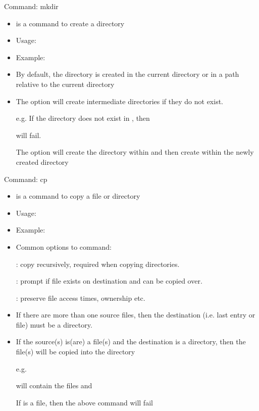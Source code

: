 \documentclass[10pt,t]{beamer}
\begin{document}
\begin{frame}[fragile]{Command: mkdir}
  \begin{itemize}
    \item {} is a command to create a directory
    \item Usage: 
    \item Example: 
    \item By default, the directory is created in the current directory or in a path relative to the current directory
    \item The  option will create intermediate directories if they do not exist.
    \item[e.g.] If the directory  does not exist in , then 
    \item[]  will fail. 
    \item[] The  option will create the  directory within  and then create  within the newly created  directory
  \end{itemize}
\end{frame}

\begin{frame}[fragile]{Command: cp}
  \begin{itemize}
    \item {} is a command to copy a file or directory
    \item Usage: 
    \item Example: 
    \item Common options to  command:
    \item[] : copy recursively, required when copying directories.
    \item[] : prompt if file exists on destination and can be copied over.
    \item[] : preserve file access times, ownership etc.
    \item If there are more than one source files, then the destination (i.e. last entry or file) must be a directory.
    \item If the source(s) is(are) a file(s) and the destination is a directory, then the file(s) will be copied into the directory
    \item[e.g.]
    \item[]  will contain the files  and 
    \item[] If  is a file, then the above command will fail
  \end{itemize}
\end{frame}
\end{document}
